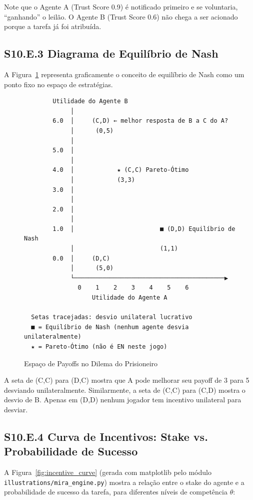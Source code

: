 Note que o Agente A (Trust Score 0.9) é notificado primeiro e se voluntaria, ``ganhando'' o leilão. O Agente B (Trust Score 0.6) não chega a ser acionado porque a tarefa já foi atribuída.

\subsection*{S10.E.3 Diagrama de Equilíbrio de Nash}

A Figura~\ref{fig:nash_diagram} representa graficamente o conceito de equilíbrio de Nash como um ponto fixo no espaço de estratégias.

\begin{figure}[htbp]
\centering
\begin{verbatim}
        Utilidade do Agente B
             │
        6.0  │     (C,D) ← melhor resposta de B a C do A?
             │      (0,5)
             │
        5.0  │
             │
        4.0  │            ★ (C,C) Pareto-Ótimo
             │            (3,3)
        3.0  │
             │
        2.0  │
             │
        1.0  │                        ■ (D,D) Equilíbrio de Nash
             │                        (1,1)
        0.0  │     (D,C)
             │      (5,0)
             └──────────────────────────────────────────▶
               0    1    2    3    4    5    6
                   Utilidade do Agente A

  Setas tracejadas: desvio unilateral lucrativo
  ■ = Equilíbrio de Nash (nenhum agente desvia unilateralmente)
  ★ = Pareto-Ótimo (não é EN neste jogo)
\end{verbatim}
\caption{Espaço de Payoffs no Dilema do Prisioneiro}
\label{fig:nash_diagram}
\end{figure}

A seta de (C,C) para (D,C) mostra que A pode melhorar seu payoff de 3 para 5 desviando unilateralmente. Similarmente, a seta de (C,C) para (C,D) mostra o desvio de B. Apenas em (D,D) nenhum jogador tem incentivo unilateral para desviar.

\subsection*{S10.E.4 Curva de Incentivos: Stake vs. Probabilidade de Sucesso}

A Figura~\ref{fig:incentive_curve} (gerada com matplotlib pelo módulo \texttt{illustrations/mira\_engine.py}) mostra a relação entre o stake do agente e a probabilidade de sucesso da tarefa, para diferentes níveis de competência $\theta$:

